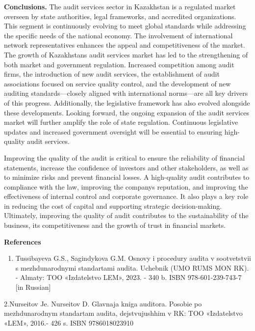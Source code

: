\textbf{Conclusions.} The audit services sector in Kazakhstan is a
regulated market overseen by state authorities, legal frameworks, and
accredited organizations. This segment is continuously evolving to meet
global standards while addressing the specific needs of the national
economy. The involvement of international network representatives
enhances the appeal and competitiveness of the market. The growth of
Kazakhstan\textquotesingle s audit services market has led to the
strengthening of both market and government regulation. Increased
competition among audit firms, the introduction of new audit services,
the establishment of audit associations focused on service quality
control, and the development of new auditing standards---closely aligned
with international norms---are all key drivers of this progress.
Additionally, the legislative framework has also evolved alongside these
developments. Looking forward, the ongoing expansion of the audit
services market will further amplify the role of state regulation.
Continuous legislative updates and increased government oversight will
be essential to ensuring high-quality audit services.

Improving the quality of the audit is critical to ensure the reliability
of financial statements, increase the confidence of investors and other
stakeholders, as well as to minimize risks and prevent financial losses.
A high-quality audit contributes to compliance with the law, improving
the company\textquotesingle s reputation, and improving the
effectiveness of internal control and corporate governance. It also
plays a key role in reducing the cost of capital and supporting
strategic decision-making. Ultimately, improving the quality of audit
contributes to the sustainability of the business, its competitiveness
and the growth of trust in financial markets.

\hl{}

\textbf{References}

\begin{enumerate}
\def\labelenumi{\arabic{enumi}.}
\item
  Tussibayeva G.S., Sagindykova G.M. Osnovy i procedury audita v
  sootvetstvii s mezhdunarodnymi standartami audita. Uchebnik (UMO RUMS
  MON RK). - Almaty: TOO «Izdatel\textquotesingle stvo LEM», 2023. - 340
  b. ISBN 978-601-239-743-7 {[}in Russian{]}
\end{enumerate}

2.Nurseitov Je. Nurseitov D. Glavnaja kniga auditora. Posobie po
mezhdunarodnym standartam audita, dejstvujushhim v RK: TOO
«Izdatel\textquotesingle stvo «LEM», 2016.- 426 s. ISBN 9786018023910

